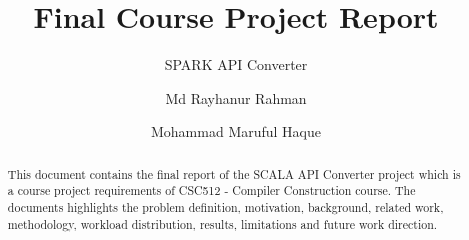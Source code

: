 \documentclass[sigplan]{acmart}\settopmatter{printfolios=true,printccs=false,printacmref=false}
\begin{document}
\title[Final Course Project Report]{Final Course Project Report}         
\subtitle{SPARK API Converter}                    


\author{Md Rayhanur Rahman}

\author{Mohammad Maruful Haque}


\begin{abstract}
This document contains the final report of the SCALA API Converter project which is a course project requirements of CSC512 - Compiler Construction course. The documents highlights the problem definition, motivation, background, related work, methodology, workload distribution, results, limitations and future work direction.
\end{abstract}

\maketitle
\end{document}

